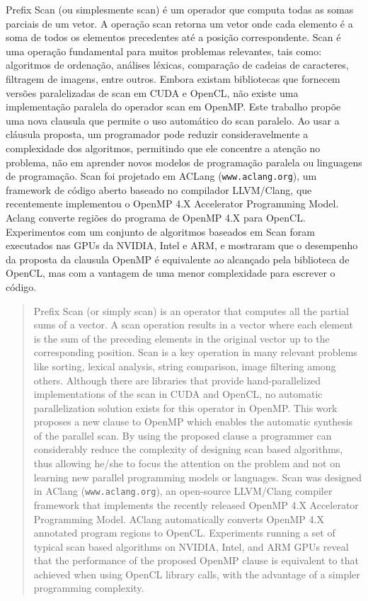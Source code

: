 \documentclass[Ingles]{ic-tese-v1}
\begin{document}
\begin{resumo}
Prefix Scan (ou simplesmente scan) é um operador que computa todas as somas
parciais de um vetor. A operação scan retorna um vetor onde cada elemento é a
soma de todos os elementos precedentes até a posição correspondente. Scan é uma
operação fundamental para muitos problemas relevantes, tais como: algoritmos de
ordenação, análises léxicas, comparação de cadeias de caracteres, filtragem de
imagens, entre outros. Embora existam bibliotecas que fornecem versões
paralelizadas de scan em CUDA e OpenCL, não existe uma implementação paralela
do operador scan em OpenMP. Este trabalho propõe uma nova clausula que permite
o uso automático do scan paralelo. Ao usar a cláusula proposta, um programador
pode reduzir consideravelmente a complexidade dos algoritmos, permitindo que
ele concentre a atenção no problema, não em aprender novos modelos de
programação paralela ou linguagens de programação. Scan foi projetado em ACLang
(\texttt{www.aclang.org}), um framework de código aberto baseado no compilador
LLVM/Clang, que recentemente implementou o OpenMP 4.X Accelerator Programming
Model. Aclang converte regiões do programa de OpenMP 4.X para OpenCL.
Experimentos com um conjunto de algoritmos baseados em Scan foram executados
nas GPUs da NVIDIA, Intel e ARM, e mostraram que o desempenho da proposta da
clausula OpenMP é equivalente ao alcançado pela biblioteca de OpenCL, mas com a
vantagem de uma menor complexidade para escrever o código.
\end{resumo}

\begin{abstract}
  Prefix Scan  (or simply scan) is  an operator that computes  all the
  partial sums of a vector. A scan operation results in a vector where
  each element  is the sum of  the preceding elements in  the original
  vector up to the corresponding position.  Scan is a key operation in
  many  relevant  problems  like  sorting,  lexical  analysis,  string
  comparison,  image  filtering  among   others.  Although  there  are
  libraries  that provide  hand-parallelized  implementations  of the scan
  in  CUDA and OpenCL,  no automatic parallelization solution exists
  for this operator in  OpenMP. This work proposes a new  clause
  to OpenMP which  enables  the  automatic synthesis of the
  parallel  scan.  By   using  the  proposed  clause   a  programmer  can
  considerably  reduce   the  complexity   of  designing   scan  based
  algorithms, thus allowing he/she to focus the attention on the problem
  and not on  learning new  parallel  programming  models  or
  languages.  Scan was designed  in AClang (\texttt{www.aclang.org}),
  an open-source LLVM/Clang compiler  framework     that  implements  the
  recently released OpenMP 4.X Accelerator Programming Model.
  AClang automatically converts OpenMP 4.X annotated program regions
  to OpenCL. Experiments running a  set of typical scan  based  algorithms
  on NVIDIA, Intel, and ARM GPUs reveal that  the performance
  of  the  proposed  OpenMP  clause  is equivalent to that achieved when using
  OpenCL library calls, with the advantage of  a
  simpler programming  complexity.
\end{abstract}
\end{document}
